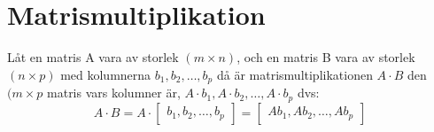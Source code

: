 \section{Matrismultiplikation} %
\label{sec:matrismultiplikation}
\begin{Def}
    Låt en matris A vara av storlek $(m \times n)$, och en matris B vara av storlek $(n \times p)$ med kolumnerna $b_1,b_2, \dots ,b_p$ då är matrismultiplikationen $A \cdot B$ den $(m \times p$ matris vars kolumner är, $A \cdot b_1, A \cdot b_2, \dots, A \cdot b_p$ dvs:
    \[
        A \cdot B = A \cdot \begin{bmatrix} b_1,b_2, \dots, b_p \end{bmatrix} = \begin{bmatrix} Ab_1,Ab_2, \dots, Ab_p \end{bmatrix}
    \]
\end{Def}
